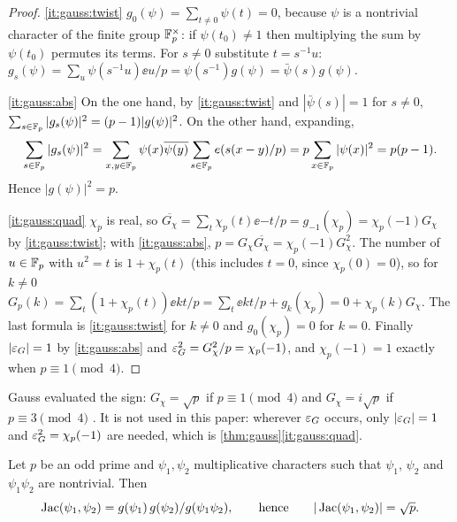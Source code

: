 \begin{proof}
\ref{it:gauss:twist} $g_0(\psi)=\sum_{t\ne0}\psi(t)=0$, because $\psi$ is a
nontrivial character of the finite group $\mathbb F_p^\times$: if $\psi(t_0)\ne1$ then
multiplying the sum by $\psi(t_0)$ permutes its terms. For $s\ne0$ substitute
$t=s^{-1}u$: $g_s(\psi)=\sum_u\psi(s^{-1}u)\ee{u/p}=\psi(s^{-1})g(\psi)=\bar\psi(s)g(\psi)$.

\ref{it:gauss:abs} On the one hand, by \ref{it:gauss:twist} and
$|\bar\psi(s)|=1$ for $s\ne0$, $\sum_{s\in\mathbb F_p}|g_s(\psi)|^2=(p-1)|g(\psi)|^2$.
On the other hand, expanding,
\[
  \sum_{s\in\mathbb F_p}|g_s(\psi)|^2=\sum_{x,y\in\mathbb F_p}\psi(x)\overline{\psi(y)}\sum_{s\in\mathbb F_p}e\!\left(s(x-y)/p\right)=p\sum_{x\in\mathbb F_p}|\psi(x)|^2=p(p-1).
\]
Hence $|g(\psi)|^2=p$.

\ref{it:gauss:quad} $\chi_p$ is real, so
$\overline{G_\chi}=\sum_t\chi_p(t)\ee{-t/p}=g_{-1}(\chi_p)=\chi_p(-1)G_\chi$ by
\ref{it:gauss:twist}; with \ref{it:gauss:abs},
$p=G_\chi\overline{G_\chi}=\chi_p(-1)G_\chi^2$. The number of $u\in\mathbb F_p$ with
$u^2=t$ is $1+\chi_p(t)$ (this includes $t=0$, since $\chi_p(0)=0$), so for
$k\ne0$
$G_p(k)=\sum_t(1+\chi_p(t))\ee{kt/p}=\sum_t\ee{kt/p}+g_k(\chi_p)=0+\chi_p(k)G_\chi$.
The last formula is \ref{it:gauss:twist} for $k\ne0$ and $g_0(\chi_p)=0$ for
$k=0$. Finally $|\varepsilon_G|=1$ by \ref{it:gauss:abs} and
$\varepsilon_G^2=G_\chi^2/p=\chi_p(-1)$, and $\chi_p(-1)=1$ exactly when
$p\equiv1\pmod4$.
\end{proof}

\begin{remark}\label{rem:gauss-sign}
Gauss evaluated the sign: $G_\chi=\sqrt p$ if $p\equiv1\pmod4$ and
$G_\chi=i\sqrt p$ if $p\equiv3\pmod4$ \cite[Ch.~6, \S4]{IrelandRosen}. It is
not used in this paper: wherever $\varepsilon_G$ occurs, only $|\varepsilon_G|=1$ and
$\varepsilon_G^2=\chi_p(-1)$ are needed, which is \cref{thm:gauss}\ref{it:gauss:quad}.
\end{remark}

\begin{theorem}\label{thm:jacobi}
Let $p$ be an odd prime and $\psi_1,\psi_2$ multiplicative characters such that
$\psi_1$, $\psi_2$ and $\psi_1\psi_2$ are nontrivial. Then
\[
  \operatorname{Jac}(\psi_1,\psi_2)=g(\psi_1)\,g(\psi_2)/g(\psi_1\psi_2),\qquad\text{hence}\qquad |\operatorname{Jac}(\psi_1,\psi_2)|=\sqrt p .
\]
\end{theorem}

